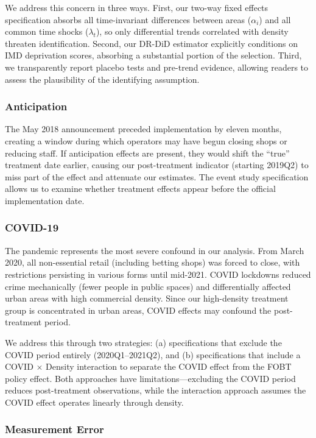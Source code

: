 \documentclass[12pt]{article}
\begin{document}
We address this concern in three ways. First, our two-way fixed effects specification absorbs all time-invariant differences between areas ($\alpha_i$) and all common time shocks ($\lambda_t$), so only differential trends correlated with density threaten identification. Second, our DR-DiD estimator explicitly conditions on IMD deprivation scores, absorbing a substantial portion of the selection. Third, we transparently report placebo tests and pre-trend evidence, allowing readers to assess the plausibility of the identifying assumption.

\subsubsection{Anticipation}

The May 2018 announcement preceded implementation by eleven months, creating a window during which operators may have begun closing shops or reducing staff. If anticipation effects are present, they would shift the ``true'' treatment date earlier, causing our post-treatment indicator (starting 2019Q2) to miss part of the effect and attenuate our estimates. The event study specification allows us to examine whether treatment effects appear before the official implementation date.

\subsubsection{COVID-19}

The pandemic represents the most severe confound in our analysis. From March 2020, all non-essential retail (including betting shops) was forced to close, with restrictions persisting in various forms until mid-2021. COVID lockdowns reduced crime mechanically (fewer people in public spaces) and differentially affected urban areas with high commercial density. Since our high-density treatment group is concentrated in urban areas, COVID effects may confound the post-treatment period.

We address this through two strategies: (a) specifications that exclude the COVID period entirely (2020Q1--2021Q2), and (b) specifications that include a COVID $\times$ Density interaction to separate the COVID effect from the FOBT policy effect. Both approaches have limitations---excluding the COVID period reduces post-treatment observations, while the interaction approach assumes the COVID effect operates linearly through density.

\subsubsection{Measurement Error}
\end{document}

